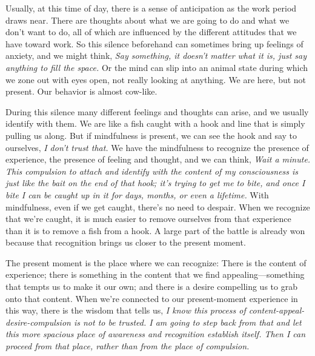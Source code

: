 Usually, at this time of day, there is a sense of anticipation as the 
work period draws near. There are thoughts about what we are going to 
do and what we don't want to do, all of which are influenced by the 
different attitudes that we have toward work. So this silence 
beforehand can sometimes bring up feelings of anxiety, and we might 
think, \emph{Say something, it doesn't matter what it is, just say 
anything to fill the space.} Or the mind can slip into an animal state 
during which we zone out with eyes open, not really looking at 
anything. We are here, but not present. Our behavior is almost cow-like.

During this silence many different feelings and thoughts can arise, and 
we usually identify with them. We are like a fish caught with a hook 
and line that is simply pulling us along. But if mindfulness is 
present, we can see the hook and say to ourselves, \emph{I don't trust 
that.} We have the mindfulness to recognize the presence of experience, 
the presence of feeling and thought, and we can think, \emph{Wait a 
minute. This compulsion to attach and identify with the content of my 
consciousness is just like the bait on the end of that hook; it's 
trying to get me to bite, and once I bite I can be caught up in it for 
days, months, or even a lifetime.} With mindfulness, even if we get 
caught, there's no need to despair. When we recognize that we're 
caught, it is much easier to remove ourselves from that experience than 
it is to remove a fish from a hook. A large part of the battle is 
already won because that recognition brings us closer to the present 
moment.

The present moment is the place where we can recognize: There is the 
content of experience; there is something in the content that we find 
appealing---something that tempts us to make it our own; and there is a 
desire compelling us to grab onto that content. When we're connected to 
our present-moment experience in this way, there is the wisdom that 
tells us, \emph{I know this process of content-appeal-desire-compulsion 
is not to be trusted. I am going to step back from that and let this 
more spacious place of awareness and recognition establish itself. Then 
I can proceed from that place, rather than from the place of 
compulsion.}


